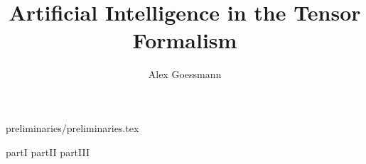 \documentclass[graybox,envcountchap,sectrefs]{../style-files/SNmono}
\begin{document}
    \author{Alex Goessmann}
    \title{Artificial Intelligence in the Tensor Formalism}
    \maketitle

    \frontmatter%

%
%
%
%
%

    \tableofcontents

    

%    
    {preliminaries/preliminaries.tex}
    \mainmatter%

    {partI}
    {partII}
    {partIII}
%    
%    
%    

    \backmatter%
    
%    
    \printindex

    
    
\end{document}
